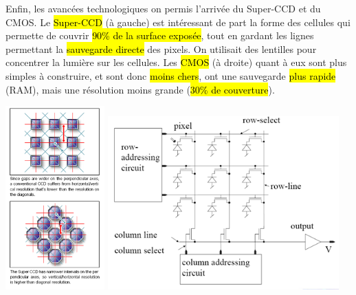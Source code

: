 \documentclass[letterpaper, 12pt]{article}
\newcommand{\alinea}{
\hspace*{0.5cm}}
\begin{document}
		\alinea Enfin, les avancées technologiques on permis l'arrivée du Super-CCD et du CMOS. Le \hl{Super-CCD} (à gauche) est
			intéressant de part la forme des cellules qui permette de couvrir \hl{90\% de la surface exposée}, tout en gardant les 
			lignes permettant la \hl{sauvegarde directe} des pixels. On utilisait des lentilles pour concentrer la lumière sur les cellules. 
			Les \hl{CMOS} (à droite) quant à eux sont plus simples à construire, et sont donc \hl{moins chers}, ont une sauvegarde 
			\hl{plus rapide} (RAM), mais une résolution moins grande (\hl{30\% de couverture}).
		\begin{center}
			\includegraphics[width=1.5in]{Images/ccd5} \hfill \includegraphics[width=3.5in]{Images/cmos}
		\end{center}
\end{document}

